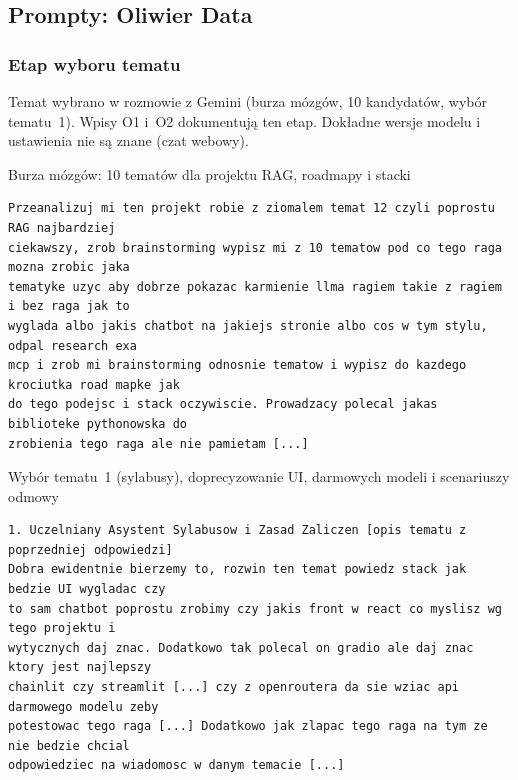 \subsection{Prompty: Oliwier Data}
\label{app:prompty-oliwier}

\subsubsection*{Etap wyboru tematu}

Temat wybrano w rozmowie z Gemini (burza mózgów, 10 kandydatów, wybór tematu~1). Wpisy O1 i~O2
dokumentują ten etap. Dokładne wersje modelu i ustawienia nie są znane (czat webowy).

  {Burza mózgów: 10 tematów dla projektu RAG, roadmapy i stacki}
\begin{lstlisting}
Przeanalizuj mi ten projekt robie z ziomalem temat 12 czyli poprostu RAG najbardziej
ciekawszy, zrob brainstorming wypisz mi z 10 tematow pod co tego raga mozna zrobic jaka
tematyke uzyc aby dobrze pokazac karmienie llma ragiem takie z ragiem i bez raga jak to
wyglada albo jakis chatbot na jakiejs stronie albo cos w tym stylu, odpal research exa
mcp i zrob mi brainstorming odnosnie tematow i wypisz do kazdego krociutka road mapke jak
do tego podejsc i stack oczywiscie. Prowadzacy polecal jakas biblioteke pythonowska do
zrobienia tego raga ale nie pamietam [...]
\end{lstlisting}

  {Wybór tematu~1 (sylabusy), doprecyzowanie UI, darmowych modeli i scenariuszy odmowy}
\begin{lstlisting}
1. Uczelniany Asystent Sylabusow i Zasad Zaliczen [opis tematu z poprzedniej odpowiedzi]
Dobra ewidentnie bierzemy to, rozwin ten temat powiedz stack jak bedzie UI wygladac czy
to sam chatbot poprostu zrobimy czy jakis front w react co myslisz wg tego projektu i
wytycznych daj znac. Dodatkowo tak polecal on gradio ale daj znac ktory jest najlepszy
chainlit czy streamlit [...] czy z openroutera da sie wziac api darmowego modelu zeby
potestowac tego raga [...] Dodatkowo jak zlapac tego raga na tym ze nie bedzie chcial
odpowiedziec na wiadomosc w danym temacie [...]
\end{lstlisting}

